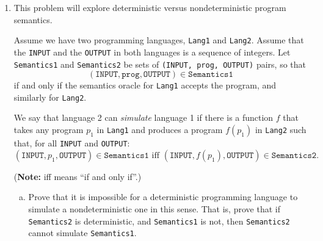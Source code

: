 \documentclass{article}
\begin{document}
\begin{enumerate}
Here is a starting skeleton. Please use the signature as follows
(you can modify the body).
\begin{verbatim}
pub fn parse_bf(bf_str: &str) -> Option<BFProg> {
    // define some additional state here ...
    // (what state would be useful to maintain during the parsing?)

    // Iterate through the string. We can use .chars():
    for char in bf_str.chars() {
        // TODO
        unimplemented!()
    }
}
\end{verbatim}

Write at least two unit tests that show your parser seems to be working.

Answer the following in the LaTeX:
is there any program for which displaying it, followed by parsing the resulting display, does NOT result
in the same program that you started with?
Why or why not?

If yes, demonstrate an example of such a program in a unit test.

Your unit tests for this problem should be called \texttt{test\_parser\_1}, \texttt{test\_parser\_2}, \texttt{test\_parser\_3}, etc.


\item
This problem will explore deterministic versus nondeterministic program semantics.

Assume we have two programming languages, \texttt{Lang1} and \texttt{Lang2}.
Assume that the \texttt{INPUT} and the \texttt{OUTPUT} in both languages is a sequence of integers.
Let \texttt{Semantics1} and \texttt{Semantics2} be sets of \texttt{(INPUT, prog, OUTPUT)} pairs, so that
$$
(\texttt{INPUT}, \texttt{prog}, \texttt{OUTPUT}) \in \texttt{Semantics1}
$$
if and only if the semantics oracle for \texttt{Lang1} accepts the program, and similarly for \texttt{Lang2}.

We say that language 2 can \emph{simulate} language 1 if there is a function $f$ that takes any program
$p_1$ in \texttt{Lang1} and produces a program $f(p_1)$ in \texttt{Lang2} such that,
for all \texttt{INPUT} and \texttt{OUTPUT}:
$$
(\texttt{INPUT}, p_1, \texttt{OUTPUT}) \in \texttt{Semantics1}
\text{ iff }
(\texttt{INPUT}, f(p_1), \texttt{OUTPUT}) \in \texttt{Semantics2}.
$$

(\textbf{Note:} iff means ``if and only if''.)

\begin{enumerate}[(a)]
\item Prove that it is impossible for a deterministic programming language to simulate a nondeterministic one in
this sense. That is, prove that if
\texttt{Semantics2} is deterministic, and \texttt{Semantics1} is not, then \texttt{Semantics2} cannot simulate \texttt{Semantics1}.


\end{enumerate}
\end{enumerate}
\end{document}
